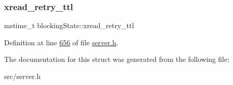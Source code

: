 \subsubsection{\texorpdfstring{xread\+\_\+retry\+\_\+ttl}{xread\_retry\_ttl}}
{\footnotesize\ttfamily mstime\+\_\+t blocking\+State\+::xread\+\_\+retry\+\_\+ttl}



Definition at line \hyperlink{server_8h_source_l00656}{656} of file \hyperlink{server_8h_source}{server.\+h}.



The documentation for this struct was generated from the following file\+:\begin{DoxyCompactItemize}
\item 
src/server.\+h\end{DoxyCompactItemize}
